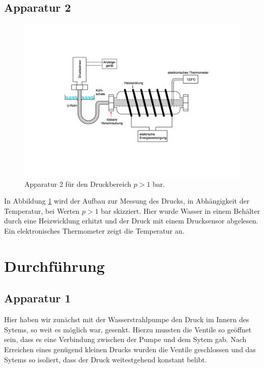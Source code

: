 \newpage

\subsection{Apparatur 2}

  \begin{figure}[h!]
    \centering
    \includegraphics[width = \textwidth]{Apparatur2.pdf}
    \caption{Apparatur 2 für den Druckbereich $p > 1$ \si{bar}.}
    \label{fig: Apparatur2}
  \end{figure}

\FloatBarrier

In Abbildung \ref{fig: Apparatur2} wird der Aufbau zur Messung des Drucks, in Abhängigkeit der
Temperatur, bei Werten $p > 1$ \si{bar} skizziert. Hier wurde Wasser in einem Behälter durch eine
Heizwicklung erhitzt und der Druck mit einem Drucksensor abgelesen. Ein elektronisches Thermometer
zeigt die Temperatur an.

\newpage

\section{Durchführung}
\label{sec:Durchführung}

\subsection{Apparatur 1}

Hier haben wir zunächst mit der Wasserstrahlpumpe den Druck im Innern des Sytems, so weit es möglich war,
gesenkt. Hierzu mussten die Ventile so geöffnet sein, dass es eine Verbindung zwischen der Pumpe
und dem Sytem gab. Nach Erreichen eines genügend kleinen Drucks wurden die Ventile geschlossen und
das Sytems so isoliert, dass der Druck weitestgehend konstant belibt.

